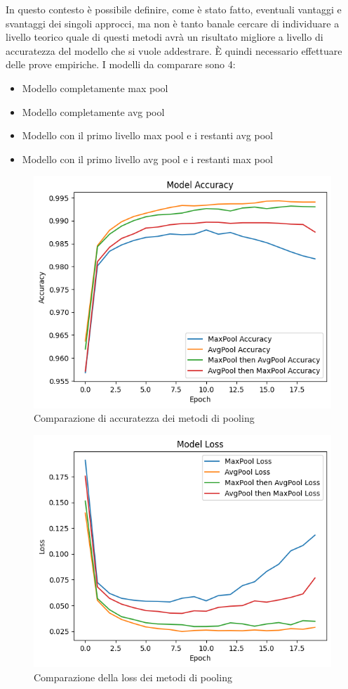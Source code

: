 \documentclass[a4paper,12pt]{article}
\begin{document}
In questo contesto è possibile definire, come è stato fatto, eventuali vantaggi e svantaggi dei singoli approcci, ma non è tanto banale cercare di individuare a livello teorico quale di questi metodi avrà un risultato migliore a livello di accuratezza del modello che si vuole addestrare. È quindi necessario effettuare delle prove empiriche.
I modelli da comparare sono 4:
\begin{itemize}
    \item Modello completamente max pool
    \item Modello completamente avg pool
    \item Modello con il primo livello max pool e i restanti avg pool
    \item Modello con il primo livello avg pool e i restanti max pool
\end{itemize}

\begin{figure}
    \centering
    \includegraphics[width=0.8\linewidth]{images/pool_accuracy_comparison.png}
    \caption{Comparazione di accuratezza dei metodi di pooling}
    \label{pool_accuracy_comparison}
\end{figure}

\begin{figure}
    \centering
    \includegraphics[width=0.8\linewidth]{images/pool_loss_comparison.png}
    \caption{Comparazione della loss dei metodi di pooling}
    \label{pool_loss_comparison}
\end{figure}
\end{document}
